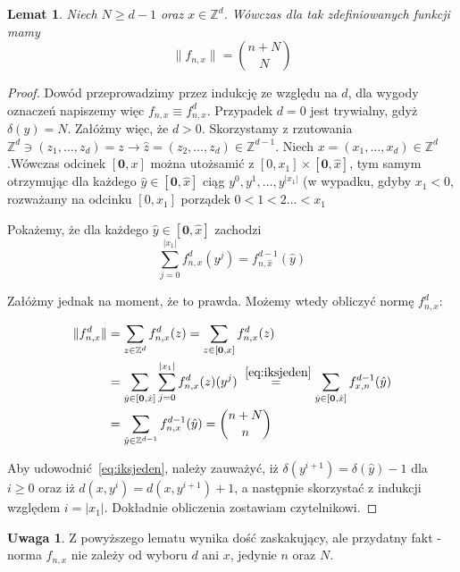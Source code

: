 \documentclass[licencjacka]{pracamgr}
\theoremstyle{definition}
\theoremstyle{definition}
\newtheorem{remark}{Uwaga}[section]
\theoremstyle{definition}
\theoremstyle{definition}
\theoremstyle{definition}
\theoremstyle{plain}
\newtheorem{lemma}{Lemat}[section]
\theoremstyle{plain}
\begin{document}
\begin{lemma}
	Niech $ N \geq d - 1 $ oraz $ x \in \mathbb{Z}^d $. Wówczas dla tak zdefiniowanych funkcji 
	mamy $$ \| f_{n,x}\|  = { n + N \choose N}$$
\end{lemma}
\begin{proof}
	Dowód przeprowadzimy przez indukcję ze względu na $ d $, dla wygody oznaczeń napiszemy 
	więc $ f_{n,x} \equiv f_{n,x}^d $. Przypadek $ d = 0 $ jest trywialny, gdyż 
	$ \delta(y) = N $. Załóżmy więc, że $ d > 0 $. Skorzystamy z rzutowania 
	$ \mathbb{Z}^d \ni (z_1, \dots, z_d) = z \rightarrow \hat z = (z_2, \dots, z_d) \in 
	\mathbb{Z}^{d-1} $.
	Niech $ x = (x_1, \dots, x_d) \in \mathbb{Z}^d $.Wówczas odcinek 
	$ [\textbf{0}, x]$ można utożsamić z $[0,x_1] \times [\textbf{0}, \hat x] $, tym 
	samym otrzymując dla każdego $ \hat y \in [\textbf{0}, \hat x] $ ciąg 
	$ y^0, y^1, \dots, y^{|x_1|} $ (w wypadku, gdyby $ x_1 < 0 $, rozważamy na odcinku 
	$ [0,x_1] $ porządek $ 0 < 1 < 2 \dots <x_1 $

	Pokażemy, że dla każdego $ \hat y \in [\textbf{0}, \hat x] $ zachodzi 
	\begin{equation} \label{eq:iksjeden}
	\sum\limits_{j = 0}^{|x_1|} f_{n,x}^d(y^j) = f^{d-1}_{n,\hat x}(\hat y)
	\end{equation}

	Załóżmy jednak na moment, że to prawda. Możemy wtedy obliczyć normę $ f_{n,x}^d $:

	\begin{align*}
		\| f^d_{n,x} \| & = \sum\limits_{z \in \mathbb{Z}^d}f^d_{n,x}(z) = 
		\sum\limits_{z \in [\textbf{0}, x]} f^d_{n,x} (z) \\
		& = \sum\limits_{\hat y \in [\textbf{0}, \hat x]} \sum\limits_{j = 0}^{|x_1|}
		f_{n,x}^d(z) (y^j) \stackrel{~\ref{eq:iksjeden}}{=} \sum\limits_{\hat y 
		\in [\textbf{0}, \hat x]} f^{d-1}_{x,n} (\hat y) \\
		& = \sum\limits_{\hat y \in \mathbb{Z}^{d-1}} f_{n,x}^{d-1} (\hat y) = 
		{n + N \choose n} 
	\end{align*}

	Aby udowodnić~\ref{eq:iksjeden}, należy zauważyć, iż 
	$ \delta (y^{i+1}) = \delta(\hat y) - 1 $ dla $ i \geq 0 $ oraz iż $ d(x,y^i) = 
	d(x, y^{i+1}) + 1 $, a następnie skorzystać z indukcji względem $ i = |x_1|$. 
	Dokładnie obliczenia zostawiam czytelnikowi.
\end{proof}

\begin{remark}
	Z powyższego lematu wynika dość zaskakujący, ale przydatny fakt - norma 
	$ f_{n,x} $ nie zależy od wyboru $ d $ ani $ x $, jedynie $ n $ oraz $ N $.
\end{remark}
\end{document}
